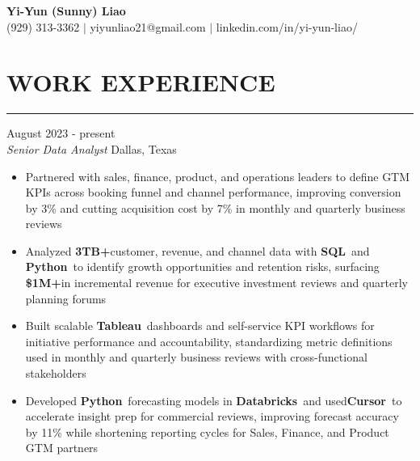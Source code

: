 \documentclass[11pt,letterpaper]{article}
\begin{document}
\vspace{-2pt}
\begin{center}
  {\Large\textbf{Yi-Yun (Sunny) Liao}}\\[-2pt]
  (929) 313-3362 $|$ yiyunliao21@gmail.com $|$ linkedin.com/in/yi-yun-liao/
\end{center}

\vspace{-6pt}
\section*{WORK EXPERIENCE}
\vspace{-8pt}\noindent\rule{\textwidth}{0.8pt}

\vspace{2pt}
 \hfill August 2023 - present\\[-1pt]
\textit{Senior Data Analyst} \hfill Dallas, Texas
\begin{itemize}[leftmargin=1.45em, rightmargin=0pt, itemsep=-2pt, topsep=-1pt, parsep=0pt]
  \item \justifying Partnered with sales, finance, product, and operations leaders to define GTM KPIs across booking funnel and channel performance, improving conversion by 3\% and cutting acquisition cost by 7\% in monthly and quarterly business reviews
  \item \justifying Analyzed \textbf{3TB+}\hspace{0.25em}customer, revenue, and channel data with \textbf{SQL}\ and \textbf{Python}\ to identify growth opportunities and retention risks, surfacing \textbf{\$1M+}\hspace{0.25em}in incremental revenue for executive investment reviews and quarterly planning forums
  \item \justifying Built scalable \textbf{Tableau}\ dashboards and self-service KPI workflows for initiative performance and accountability, standardizing metric definitions used in monthly and quarterly business reviews with cross-functional stakeholders
  \item \justifying Developed \textbf{Python}\ forecasting models in \textbf{Databricks}\ and used\hspace{0.25em}\textbf{Cursor}\ to accelerate insight prep for commercial reviews, improving forecast accuracy by 11\% while shortening reporting cycles for Sales, Finance, and Product GTM partners
\end{itemize}
\end{document}
